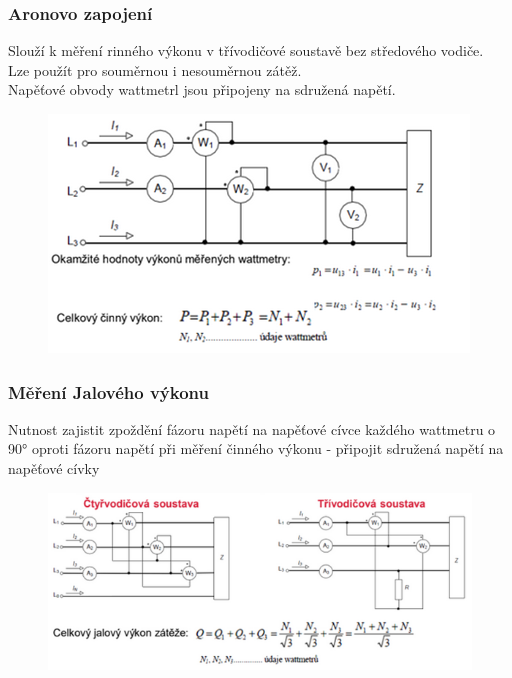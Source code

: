 \subsubsection*{Aronovo zapojení}
Slouží k měření rinného výkonu v třívodičové soustavě bez středového vodiče.\\
Lze použít pro souměrnou i nesouměrnou zátěž.\\
Napěťové obvody wattmetrl jsou připojeny na sdružená napětí.
\begin{figure}[H]
    \includegraphics*[scale = 1.2]{images/Aron.png}
\end{figure}

\subsubsection*{Měření Jalového výkonu}
Nutnost zajistit zpoždění fázoru napětí na napěťové cívce každého wattmetru o 90° oproti fázoru napětí při měření činného výkonu - připojit sdružená napětí na napěťové cívky\\
\begin{figure}[H]
    \includegraphics*[scale = 1]{images/jalonen.png}
\end{figure}
\newpage

